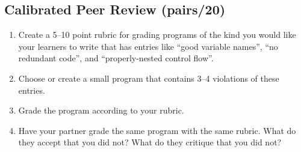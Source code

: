 \subsection*{Calibrated Peer Review (pairs/20)}

\begin{enumerate}
\item
  Create a 5--10 point rubric for grading programs of the kind you
  would like your learners to write that has entries like ``good
  variable names'', ``no redundant code'', and ``properly-nested control
  flow''.
\item
  Choose or create a small program that contains 3--4 violations of
  these entries.
\item
  Grade the program according to your rubric.
\item
  Have your partner grade the same program with the same rubric. What
  do they accept that you did not? What do they critique that you did
  not?
\end{enumerate}
